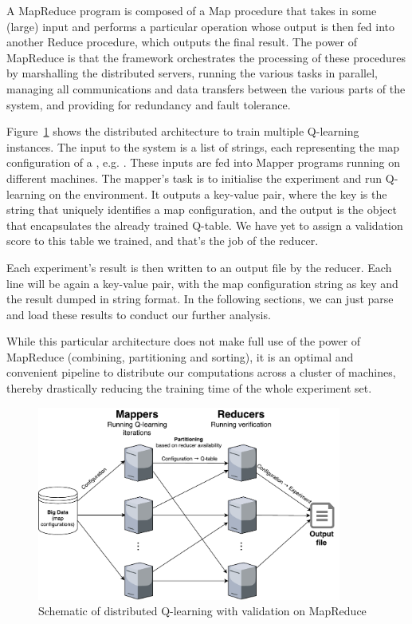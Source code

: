 A MapReduce program is composed of a Map procedure that takes in some (large) input and performs a particular operation whose output is then fed into another Reduce procedure, which outputs the final result. The power of MapReduce is that the framework orchestrates the processing of these procedures by marshalling the distributed servers, running the various tasks in parallel, managing all communications and data transfers between the various parts of the system, and providing for redundancy and fault tolerance.

Figure~\ref{fig:MapReduce} shows the distributed architecture to train multiple Q-learning instances. The input to the system is a list of strings, each representing the map configuration of a , e.g. . These inputs are fed into Mapper programs running on different machines. The mapper's task is to initialise the experiment and run Q-learning on the environment. It outputs a key-value pair, where the key is the string that uniquely identifies a map configuration, and the output is the  object that encapsulates the already trained Q-table. We have yet to assign a validation score to this table we trained, and that's the job of the reducer.

Each experiment's result is then written to an output file by the reducer. Each line will be again a key-value pair, with the map configuration string as key and the  result dumped in string format. In the following sections, we can just parse and load these results to conduct our further analysis.

While this particular architecture does not make full use of the power of MapReduce (combining, partitioning and sorting), it is an optimal and convenient pipeline to distribute our computations across a cluster of machines, thereby drastically reducing the training time of the whole experiment set.
\begin{figure}
\centering
\includegraphics[width=10cm]{Figures/MapReduce}
\caption{Schematic of distributed Q-learning with validation on MapReduce}
\label{fig:MapReduce}
\end{figure}

